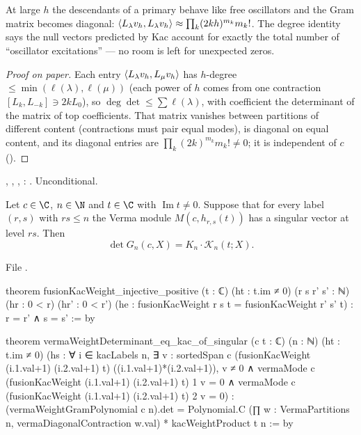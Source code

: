 \begin{physics}
At large $h$ the descendants of a primary behave like free oscillators and the Gram matrix becomes
diagonal: $\langle L_\lambda v_h,L_\lambda v_h\rangle\approx\prod_k(2kh)^{m_k}m_k!$. The degree identity
says the null vectors predicted by Kac account for exactly the total number of ``oscillator
excitations'' --- no room is left for unexpected zeros.
\end{physics}

\begin{proof}[Proof on paper]
Each entry $\langle L_\lambda v_h,L_\mu v_h\rangle$ has $h$-degree $\le\min(\ell(\lambda),\ell(\mu))$ (each power of
$h$ comes from one contraction $[L_k,L_{-k}]\ni2kL_0$), so $\deg\det\le\sum\ell(\lambda)$, with coefficient
the determinant of the matrix of top coefficients. That matrix vanishes between partitions of different
content (contractions must pair equal modes), is diagonal on equal content, and its diagonal entries are
$\prod_k(2k)^{m_k}m_k!\ne0$; it is independent of $c$ (\allowbreak{}\allowbreak{}).
\end{proof}

\begin{status}
\allowbreak{}\allowbreak{}\allowbreak{}\allowbreak{}, ,
\allowbreak{}\allowbreak{}\allowbreak{}\allowbreak{}\allowbreak{}, \allowbreak{}:
\lean{[propext, Classical.}\allowbreak{}\allowbreak\lean{sound]}. Unconditional.
\end{status}

\begin{theorem}\label{l06:thm:kaccond}
Let $c\in\C$, $n\in\N$ and $t\in\C$ with $\operatorname{Im}t\ne0$. Suppose that for every label $(r,s)$ with
$rs\le n$ the Verma module $M(c,h_{r,s}(t))$ has a singular vector at level $rs$. Then
\begin{equation*}
 \det G_n(c,X) = K_n\cdot\mathcal K_n(t;X).
\end{equation*}
\end{theorem}

File .
\begin{leancode}
theorem fusionKacWeight_injective_positive (t : ℂ) (ht : t.im ≠ 0)
    (r s r' s' : ℕ) (hr : 0 < r) (hr' : 0 < r')
    (he : fusionKacWeight r s t = fusionKacWeight r' s' t) : r = r' ∧ s = s' := by

theorem vermaWeightDeterminant_eq_kac_of_singular (c t : ℂ) (n : ℕ) (ht : t.im ≠ 0)
    (hs : ∀ i ∈ kacLabels n,
      ∃ v : sortedSpan c (fusionKacWeight (i.1.val+1) (i.2.val+1) t)
        ((i.1.val+1)*(i.2.val+1)), v ≠ 0 ∧
        vermaMode c (fusionKacWeight (i.1.val+1) (i.2.val+1) t) 1 v = 0 ∧
        vermaMode c (fusionKacWeight (i.1.val+1) (i.2.val+1) t) 2 v = 0) :
    (vermaWeightGramPolynomial c n).det =
      Polynomial.C (∏ w : VermaPartitions n, vermaDiagonalContraction w.val) *
        kacWeightProduct t n := by
\end{leancode}

